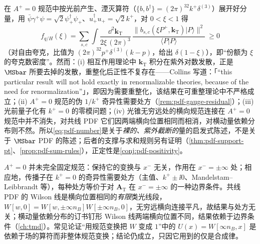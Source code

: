 \begin{remark}\label{rem:pdf-number-density}
在 $A^+=0$ 规范中按光前产生、湮灭算符（$\{b,b^\dagger\}=(2\pi)^32k^+\delta^{(3)}$）展开好分量，用 $\bar\psi\gamma^+\psi=\sqrt2\psi_+^\dagger\psi_+$、$u_+^\dagger u_+=\sqrt2k^+$，对 $0<\xi<1$ 得
\begin{equation}\label{eq:pdf-number}
f_{q/H}(\xi)=\sum_{s,c}\int\frac{\dd^{2}\bm k_{\mathrm T}}{2\xi\,(2\pi)^3}\,
\frac{\big\|b_{s,c}(\xi P^+,\bm k_{\mathrm T})|P\rangle\big\|^2}{\langle P|P\rangle}\ \ge0
\end{equation}
（对自由夸克，比值为 $(2\pi)^32p^+\delta^{(3)}(k-p)$，给出 $\delta(1-\xi)$），即“份额为 $\xi$ 的夸克数密度”\cite[第~6.7~节、第~6.9.1~节]{Collins2011}。然而：(i) 相互作用理论中 $\bm k_{\mathrm T}$ 积分在紫外对数发散，正是 $\MSbar$ 所要去掉的发散，重整化后正性不复存在——Collins 写道：「“this particular result will not hold exactly in renormalizable theories, because of the need for renormalization”」\cite[第~6.9.1~节]{Collins2011}，即因为需要重整化，该结果在可重整理论中不严格成立；(ii) $A^+=0$ 规范的伪 $1/k^+$ 奇异性需要处方（\cref{rem:pdf-gauge-residual}）；(iii) 光前量子化有 $k^+=0$ 的零模问题；(iv) 光锥无穷远处的横向规范连接在 $A^+=0$ 规范中并不消失\cite{JiYuan2002,BelitskyJiYuan2003}，对共线 PDF 它们因两端横向位置相同而相消，对横动量依赖分布则不然。所以\cref{eq:pdf-number}是关于\emph{裸的、紫外截断的}量的启发式陈述，不是关于 $\MSbar$ PDF 的陈述；后者的支撑与求和规则另有证明（\cref{thm:pdf-support-pt}、\cref{prop:pdf-sum-rules}），正定性是\cref{conj:pdf-positivity}。
\end{remark}

\begin{remark}[光锥规范的剩余规范自由与 $1/k^+$ 处方]\label{rem:pdf-gauge-residual}
$A^+=0$ 并未完全固定规范：保持它的变换与 $x^-$ 无关，作用在 $x^-=\pm\infty$ 处；相应地，传播子在 $k^+=0$ 的奇异性需要处方（主值、$k^+\pm\ii0$、Mandelstam--Leibbrandt 等），每种处方等价于对 $\bm A_{\mathrm T}$ 在 $x^-=\pm\infty$ 的一种边界条件。共线 PDF 的 Wilson 线是横向位置相同的\emph{有限}类光线段，$W[w,0]=W[w,\pm\infty n_B]W[\pm\infty n_B,0]$，无穷远横向连接平凡，故结果与处方无关；横动量依赖分布的订书钉形 Wilson 线两端横向位置不同，结果依赖于边界条件（\cref{ch:tmd}）。常见论证“用规范变换把 $W$ 变成 $1$”中的 $U(x)=W[\infty n_B,x]$ 是依赖于场的算符而非整体规范变换；结论仍成立，只因它用到的仅是合成律。
\end{remark}
